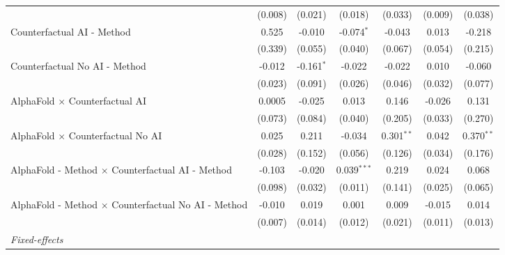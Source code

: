 \begin{tabular}{lcccccc}
                                                              & (0.008)       & (0.021)      & (0.018)       & (0.033)      & (0.009)       & (0.038)\\   
   Counterfactual AI - Method                                 & 0.525         & -0.010       & -0.074$^{*}$  & -0.043       & 0.013         & -0.218\\   
                                                              & (0.339)       & (0.055)      & (0.040)       & (0.067)      & (0.054)       & (0.215)\\   
   Counterfactual No AI - Method                              & -0.012        & -0.161$^{*}$ & -0.022        & -0.022       & 0.010         & -0.060\\   
                                                              & (0.023)       & (0.091)      & (0.026)       & (0.046)      & (0.032)       & (0.077)\\   
   AlphaFold $\times$ Counterfactual AI                       & 0.0005        & -0.025       & 0.013         & 0.146        & -0.026        & 0.131\\   
                                                              & (0.073)       & (0.084)      & (0.040)       & (0.205)      & (0.033)       & (0.270)\\   
   AlphaFold $\times$ Counterfactual No AI                    & 0.025         & 0.211        & -0.034        & 0.301$^{**}$ & 0.042         & 0.370$^{**}$\\   
                                                              & (0.028)       & (0.152)      & (0.056)       & (0.126)      & (0.034)       & (0.176)\\   
   AlphaFold - Method $\times$ Counterfactual AI - Method     & -0.103        & -0.020       & 0.039$^{***}$ & 0.219        & 0.024         & 0.068\\   
                                                              & (0.098)       & (0.032)      & (0.011)       & (0.141)      & (0.025)       & (0.065)\\   
   AlphaFold - Method $\times$ Counterfactual No AI - Method  & -0.010        & 0.019        & 0.001         & 0.009        & -0.015        & 0.014\\   
                                                              & (0.007)       & (0.014)      & (0.012)       & (0.021)      & (0.011)       & (0.013)\\   
   \midrule
   \emph{Fixed-effects}\\

\end{tabular}
